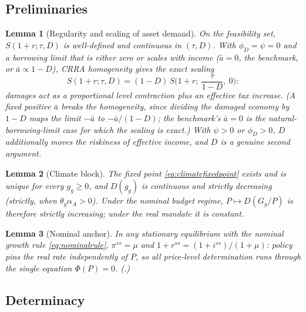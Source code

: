 \documentclass[12pt]{article}
\newtheorem{lemma}{Lemma}
\newcommand{\Sfun}{S}
\begin{document}
\subsection{Preliminaries}

\begin{lemma}[Regularity and scaling of asset demand]\label{lem:S}
On the feasibility set, $\Sfun(1+r;\tau,D)$ is well-defined and continuous in
$(\tau,D)$. With $\phi_D=\psi=0$ \emph{and} a borrowing limit that is either
zero or scales with income ($\bar a = 0$, the benchmark, or
$\bar a \propto 1-D$), CRRA homogeneity gives the exact scaling
\begin{equation}
\Sfun(1+r;\tau,D) = (1-D)\,\Sfun\!\Big(1+r;\ \frac{\tau}{1-D},\ 0\Big):
\label{eq:scaling}
\end{equation}
damages act as a proportional level contraction plus an effective tax
increase. (A fixed positive $\bar a$ breaks the homogeneity, since dividing
the damaged economy by $1-D$ maps the limit $-\bar a$ to $-\bar a/(1-D)$;
the benchmark's $\bar a=0$ is the natural-borrowing-limit case for which the
scaling is exact.) With $\psi>0$ or $\phi_D>0$, $D$ additionally moves the
riskiness of effective income, and $D$ is a genuine second argument.
\end{lemma}

\begin{lemma}[Climate block]\label{lem:climate}
The fixed point \eqref{eq:climatefixedpoint} exists and is unique for every
$g_g\ge0$, and $D(g_g)$ is continuous and strictly decreasing (strictly, when
$\theta_g\alpha_A>0$). Under the nominal budget regime, $P\mapsto D(G_g/P)$
is therefore strictly increasing; under the real mandate it is constant.
\end{lemma}

\begin{lemma}[Nominal anchor]\label{lem:anchor}
In any stationary equilibrium with the nominal growth rule
\eqref{eq:nominalrule}, $\pi^{ss}=\mu$ and $1+r^{ss}=(1+i^{ss})/(1+\mu)$:
policy pins the real rate independently of $P$, so all price-level
determination runs through the single equation $\Phi(P)=0$.
(\citealp{hagedorn2026dtpl}.)
\end{lemma}

\subsection{Determinacy}
\end{document}

